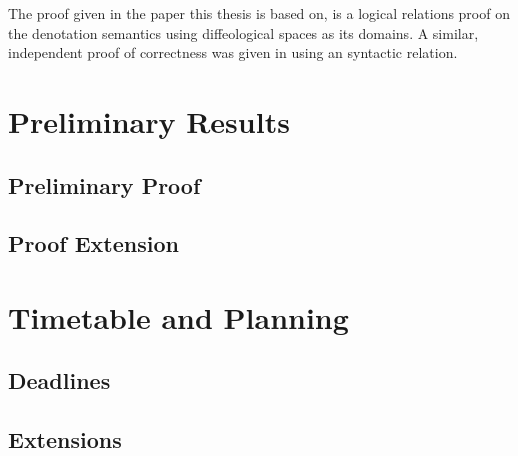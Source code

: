\documentclass[a4, 12pt, final]{article}
\begin{document}
The proof given in the paper this thesis is based on, is a logical relations proof on the denotation semantics using diffeological spaces as its domains\cite{huot2020correctness}.
A similar, independent proof of correctness was given in \cite{barthe2020versatility} using an syntactic relation.

\section{Preliminary Results}

\subsection{Preliminary Proof}

\subsection{Proof Extension}

\section{Timetable and Planning}

\subsection{Deadlines}

\subsection{Extensions}

\printbibliography
% 
\end{document}
